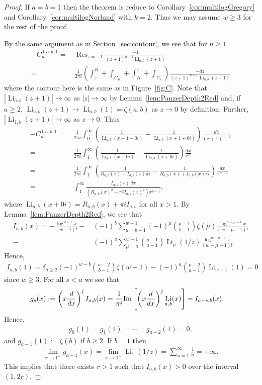 \documentclass[11pt]{article}
\newcommand\eps{{\varepsilon}}
\DeclareMathOperator{\Li}{Li}
\DeclareMathOperator{\Res}{Res}
\theoremstyle{plain}
\theoremstyle{definition}
\begin{document}
\begin{proof}
If $a=b=1$ then the theorem is reduce to Corollary~\ref{cor:multilogGregory} and Corollary~\ref{cor:multilogNorlund} with $k=2$.
Thus we may assume $w\ge 3$ for the rest of the proof.

By the same argument as in Section~\ref{sec:contour}, we see that for $n\ge 1$
\begin{align*}
-C_{n}^{0;a,b;1}= &\, \Res_{z=-1} \frac{-1}{(z+1)^{n-1}\Li_{a,b}(z+1)}   \\
=&\, \frac{1}{2\pi i}\left( \int_\eps^R +\int_{C_R}+\int_R^\eps+ \int_{C_\eps} \right) \frac{-dz}{(z+1)^{n-1}\Li_{a,b}(z+1)}
\end{align*}
where the contour here is the same as in Figure~\ref{fig:C}. Note that $|\Li_{a,b}(z+1)|\to \infty$ as $|z|\to \infty$ by Lemma~\ref{lem:PanzerDepth2Red}
and, if $a\ge 2$, $\Li_{a,b}(z+1)\to \Li_{a,b}(1)=\zeta(a,b)$ as $z\to 0$ by definition. Further,
$|\Li_{1,b}(z+1)|\to \infty$ as $z\to 0$. Thus
\begin{align*}
-C_{n}^{0;a,b;1}=&\, \frac{1}{2\pi i} \int_0^\infty \left(\frac{1}{\Li_{a,b}(x+1-0i)}-\frac{1}{\Li_{a,b}(x+1+0i)}  \right)\frac{dx}{(x+1)^{n-1}}\\
 =&\, \frac{1}{2\pi i} \int_1^\infty \left(\frac{1}{\Li_{a,b}(x-0i)}-\frac{1}{\Li_{a,b}(x+0i)}  \right)\frac{dx}{x^n}\\
=&\, \frac{1}{2\pi i} \int_1^\infty \left(\frac{1}{R_{a,b}(x)-I_{a,b}(x)\pi i}-\frac{1}{R_{a,b}(x)+I_{a,b}(x)\pi i}  \right)\frac{dx}{x^{n-1}}\\
=&\, \int_1^\infty\frac{I_{a,b}(x)\, dx}{(R_{a,b}(x)^2+\pi^2 I_{a,b}(x)^2)x^{n-1}},
\end{align*}
where $\Li_{a,b}(x+0i)=R_{a,b}(x)+\pi i I_{a,b}$ for all $x>1$. By Lemma~\ref{lem:PanzerDepth2Red}, we see that
\begin{align*}
 I_{a,b}(x)=-\frac{\log^{w-1}x}{(w-1)!}-&\, (-1)^b \sum_{\mu=b+1}^{w-1} (-1)^\mu \binom{\mu-1}{b-1} \zeta(\mu) \frac{\log^{w-\mu-1}x}{(w-\mu-1)!}\\
-&\,(-1)^a \sum_{\mu=a}^{w-1} \binom{\mu-1}{a-1} \Li_\mu(1/z) \frac{\log^{w-\mu-1}x}{(w-\mu-1)!}.
\end{align*}
Hence,
\begin{align*}
 I_{a,b}(1)=\delta_{a\ge 2} (-1)^{w-b} \binom{w-2}{b-1} \zeta(w-1)-(-1)^a \binom{\mu-2}{a-1}\Li_{w-1}(1)=0
\end{align*}
since $w\ge 3$. For all $s<a$ we see that
\begin{align*}
g_s(x):= &\,\left(x \frac{d}{dx}\right)^j I_{a,b}(x)
=\frac{1}{\pi i} {\rm Im} \left[\left(x \frac{d}{dx}\right)^j \Li_{a,b}(x)\right]=I_{a-s,b}(x).
\end{align*}
Hence,
\begin{align*}
g_0(1)=g_1(1)=\cdots=g_{a-2}(1)=0,
\end{align*}
and $g_{a-1}(1):= \zeta(b)$ if $b\ge 2$. If $b=1$ then
\begin{align*}
    \lim_{x\to 1^+} g_{a-1}(x)=\lim_{x\to 1^+}  \Li_1(1/z) = \sum_{n=1}^\infty \frac1n = +\infty.
\end{align*}
This implies that there exists $r>1$ such that $I_{a,b}(x)>0$ over the interval $(1,2r)$.


\end{proof}
\end{document}
